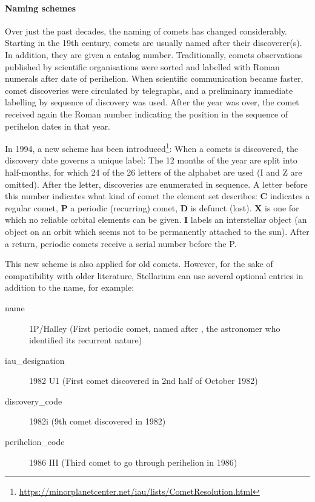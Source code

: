 \paragraph{Naming schemes}
Over just the past decades, the naming of comets has changed considerably. 
Starting in the 19th century, comets are usually named after their discoverer(s). 
In addition, they are given a catalog number. 
Traditionally, comets observations published by scientific organisations were sorted and labelled with Roman numerals after date of perihelion. 
When scientific communication became faster, comet discoveries were circulated by telegraphs, and a preliminary immediate labelling by sequence of discovery was used. 
After the year was over, the comet received again the Roman number indicating the position in the sequence of perihelon dates in that year. 

In 1994, a new scheme has been introduced\footnote{\url{https://minorplanetcenter.net/iau/lists/CometResolution.html}}: 
When a comets is discovered, the discovery date governs a unique label: 
The 12 months of the year are split into half-months, for which 24 of the 26 letters of the alphabet are used (I and Z are omitted). 
After the letter, discoveries are enumerated in sequence. 
A letter before this number indicates what kind of comet the element set describes: \textbf{C} indicates a regular comet, 
\textbf{P} a periodic (recurring) comet, \textbf{D} is defunct (lost). \textbf{X} is one for which no reliable orbital elements can be given. 
\textbf{I} labels an interstellar object (an object on an orbit which seems not to be permanently attached to the sun).
After a return, periodic comets receive a serial number before the P.

This new scheme is also applied for old comets. However, for the sake of compatibility with older literature, 
Stellarium can use several optional entries in addition to the name, for example:
\begin{description}
\item[name] 1P/Halley (First periodic comet, named after , the astronomer who identified its recurrent nature)
\item[iau\_designation] 1982 U1 (First comet discovered in 2nd half of October 1982)
\item[discovery\_code] 1982i (9th comet discovered in 1982)
\item[perihelion\_code] 1986 III (Third comet to go through perihelion in 1986)
\end{description}

